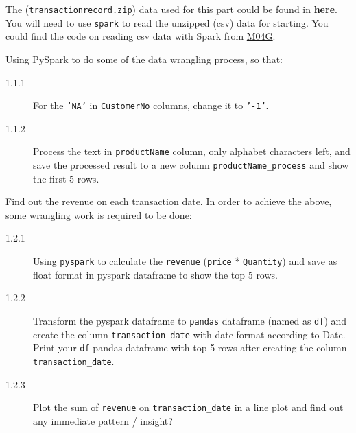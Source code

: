 \documentclass[a4paper]{article}
\begin{document}
    The (\texttt{transactionrecord.zip}) data used for this part could be found in
    \href{https://github.com/tulip-lab/sit742/blob/develop/Assessment/2024/data/transactionrecord.gz}{\textbf{here}}.
    You will need to use \texttt{spark} to read the unzipped (csv) data for starting.
    You could find the code on reading csv data with Spark from \href{https://github.com/tulip-lab/sit742/blob/develop/Jupyter/M04-DataManipulation/M04G-SparkSQL.ipynb}{M04G}.

    \begin{answer}[Question 1.1]
        Using PySpark to do some of the data wrangling process, so that:
        \begin{description}
            \item[1.1.1] For the \texttt{'NA'} in \texttt{CustomerNo} columns, change it to \texttt{'-1'}.
            \item[1.1.2] Process the text in \texttt{productName} column, only alphabet characters left, and save the processed result to a new column \texttt{productName_process} and show the first 5 rows.

        \end{description}

    \end{answer}

    \begin{answer}[Question 1.2]
    Find out the revenue on each transaction date. In order to achieve the above, some wrangling work is required to be done:
     \begin{description}
            \item[1.2.1] Using \texttt{pyspark} to calculate the \texttt{revenue} (\texttt{price} * \texttt{Quantity}) and save as float format in pyspark dataframe to show the top 5 rows.
            \item[1.2.2] Transform the pyspark dataframe to \texttt{pandas} dataframe (named as \texttt{df}) and create the column \texttt{transaction_date} with date format according to {Date}. Print your \texttt{df} pandas dataframe with top 5 rows after creating the column \texttt{transaction_date}.
            \item[1.2.3] Plot the sum of \texttt{revenue} on  \texttt{transaction_date} in a line plot and find out any immediate pattern / insight?
    \end{description}
    \end{answer}
\end{document}

